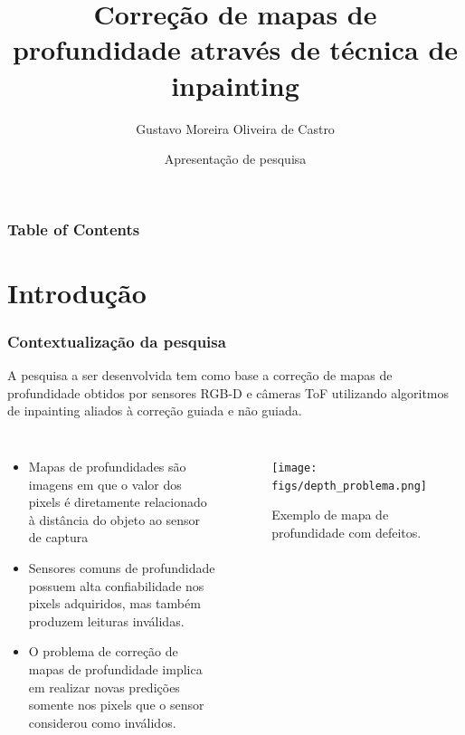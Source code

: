 \documentclass[aspectratio=169]{beamer}
\title[PAVIC] %
{Correção de mapas de profundidade através de técnica de inpainting}
\author[Gustavo Castro] %
{Gustavo Moreira Oliveira de Castro}
\institute[UFAC] %
{
  Programa de Pós Graduação em Ciência da Computação\\
  Universidade Federal do Acre
}
\date[PPGCC] %
{Apresentação de pesquisa}
\begin{document}
\frame{\titlepage}


\begin{frame}
\frametitle{Table of Contents}
\tableofcontents
\end{frame}


\section{Introdução}

\begin{frame}
\frametitle{Contextualização da pesquisa}
A pesquisa a ser desenvolvida tem como base a correção de mapas de profundidade obtidos por sensores RGB-D e câmeras ToF utilizando algoritmos de inpainting aliados à correção guiada e não guiada. 
\begin{columns}
    \begin{itemize}
    \item Mapas de profundidades são imagens em que o valor dos pixels é diretamente relacionado à distância do objeto ao sensor de captura
    \item Sensores comuns de profundidade possuem alta confiabilidade nos pixels adquiridos, mas também produzem leituras inválidas.
    \item O problema de correção de mapas de profundidade implica em realizar novas predições somente nos pixels que o sensor considerou como inválidos.
\end{itemize}


    \begin{figure}
        \centering
        \texttt{[image: figs/depth\_problema.png]}
        \caption{Exemplo de mapa de profundidade com defeitos.}
        \label{fig:enter-label}
    \end{figure}
\end{columns}


\end{frame}
\end{document}
